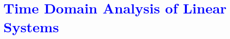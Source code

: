 \documentclass[../notes-main.tex]{subfiles}
\begin{document}
\chapter{\textcolor{blue}{Time Domain Analysis of Linear Systems}}
\end{document}

